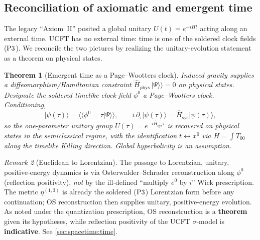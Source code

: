 \documentclass[11pt]{article}
\theoremstyle{plain}
\newtheorem{theorem}{Theorem}[section]
\theoremstyle{definition}
\theoremstyle{remark}
\newtheorem{remark}[theorem]{Remark}
\newcommand{\Pthree}{\textnormal{P3}}
\newcommand{\clock}{\phi^{0}}
\newcommand{\ket}[1]{\lvert #1\rangle}
\newcommand{\dket}[1]{\lvert #1\rangle\!\rangle}
\newcommand{\dbra}[1]{\langle\!\langle #1\rvert}
\begin{document}
\subsection{Reconciliation of axiomatic and emergent time}
\label{sec:axioms:time}

The legacy ``Axiom~II'' posited a global unitary $U(t)=e^{-iHt}$ acting along
an external time. UCFT has no external time: time is one of the soldered
clock fields ($\Pthree$). We reconcile the two pictures by realizing the
unitary-evolution statement as a theorem on physical states.

\begin{theorem}[Emergent time as a Page--Wootters clock]\label{thm:axioms:time}
Induced gravity supplies a diffeomorphism/Hamiltonian constraint
$\widehat H_{\mathrm{phys}}\,\dket{\Psi}=0$ on physical states. Designate the
soldered timelike clock field $\clock$ a Page--Wootters clock. Conditioning,
\[
  \ket{\psi(\tau)}=\dbra{\clock=\tau}\Psi\rangle\!\rangle,
  \qquad
  i\,\partial_\tau\ket{\psi(\tau)}=\widehat H_{\mathrm{sys}}\ket{\psi(\tau)},
\]
so the one-parameter unitary group $U(\tau)=e^{-i\widehat H_{\mathrm{sys}}\tau}$
is recovered on physical states in the semiclassical regime, with the
identification $t\leftrightarrow x^0$ via
$H=\int T_{00}$ along the timelike Killing direction. Global hyperbolicity is
an assumption.
\end{theorem}

\begin{remark}[Euclidean to Lorentzian]\label{rem:axioms:os}
The passage to Lorentzian, unitary, positive-energy dynamics is via
Osterwalder--Schrader reconstruction along $\clock$ (reflection positivity),
\emph{not} by the ill-defined ``multiply $e^0$ by $i$'' Wick prescription.
The metric $\eta^{(1,3)}$ is already the soldered ($\Pthree$) Lorentzian form
before any continuation; OS reconstruction then supplies unitary,
positive-energy evolution. As noted under the quantization prescription, OS
reconstruction is a \textbf{theorem} given its hypotheses, while reflection
positivity of the UCFT $\sigma$-model is \textbf{indicative}. See
\autoref{sec:spacetime:time}.
\end{remark}
\end{document}
